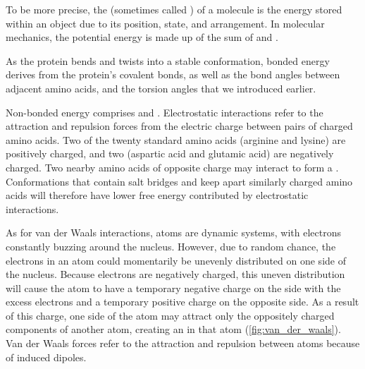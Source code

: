To be more precise, the  (sometimes called ) of a molecule is the energy stored within an object due to its position, state, and arrangement. In molecular mechanics, the potential energy is made up of the sum of  and .

As the protein bends and twists into a stable conformation, bonded energy derives from the protein's covalent bonds, as well as the bond angles between adjacent amino acids, and the torsion angles that we introduced earlier.

Non-bonded energy comprises  and . Electrostatic interactions refer to the attraction and repulsion forces from the electric charge between pairs of charged amino acids. Two of the twenty standard amino acids (arginine and lysine) are positively charged, and two (aspartic acid and glutamic acid) are negatively charged. Two nearby amino acids of opposite charge may interact to form a . Conformations that contain salt bridges and keep apart similarly charged amino acids will therefore have lower free energy contributed by electrostatic interactions.

As for van der Waals interactions, atoms are dynamic systems, with electrons constantly buzzing around the nucleus. However, due to random chance, the electrons in an atom could momentarily be unevenly distributed on one side of the nucleus. Because electrons are negatively charged, this uneven distribution will cause the atom to have a temporary negative charge on the side with the excess electrons and a temporary positive charge on the opposite side. As a result of this charge, one side of the atom may attract only the oppositely charged components of another atom, creating an  in that atom (\autoref{fig:van_der_waals}). Van der Waals forces refer to the attraction and repulsion between atoms because of induced dipoles.\\

